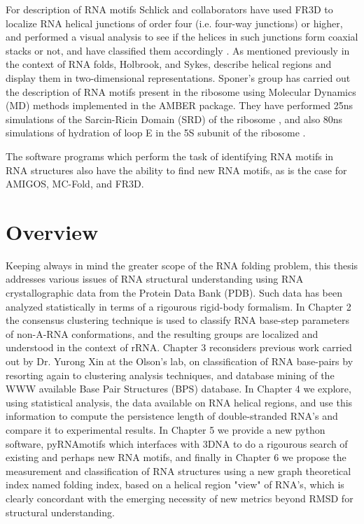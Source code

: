 For description of RNA motifs Schlick and collaborators have used FR3D
to  localize  RNA helical  junctions  of  order  four (i.e.   four-way
junctions) or  higher, and performed a  visual analysis to  see if the
helices  in  such junctions  form  coaxial  stacks  or not,  and  have
classified   them   accordingly   \cite{laing2009,  laing2009a}.    As
mentioned previously in the context of RNA folds, Holbrook, and Sykes,
describe   helical  regions  and   display  them   in  two-dimensional
representations. Sponer's group has carried out the description of RNA
motifs present  in the ribosome using Molecular  Dynamics (MD) methods
implemented  in   the  AMBER   package.   They  have   performed  25ns
simulations  of   the  Sarcin-Ricin  Domain  (SRD)   of  the  ribosome
\cite{spackova2006}, and also 80ns  simulations of hydration of loop E
in the 5S subunit of the ribosome \cite{reblova2003}.

The software programs which perform the task of identifying RNA motifs
in RNA structures also have the ability to find new RNA motifs, as is
the case for AMIGOS, MC-Fold, and FR3D.

\section{Overview}
Keeping always in  mind the greater scope of  the RNA folding problem,
this thesis  addresses various issues of  RNA structural understanding
using RNA crystallographic data from the Protein Data Bank (PDB). Such
data  has been  analyzed statistically  in terms  of a rigourous
rigid-body formalism.  In Chapter 2 the consensus clustering technique
is   used  to   classify   RNA  base-step   parameters  of   non-A-RNA
conformations, and  the resulting groups are  localized and understood
in the context  of rRNA.  Chapter 3 reconsiders  previous work carried
out by  Dr. Yurong Xin  at the Olson's  lab, on classification  of RNA
base-pairs by  resorting again to clustering  analysis techniques, and
database  mining  of the  WWW  available  Base  Pair Structures  (BPS)
database.  In  Chapter 4 we  explore, using statistical  analysis, the
data available  on RNA  helical regions, and  use this  information to
compute the persistence length of double-stranded RNA's and compare it
to  experimental  results.  In  Chapter  5 we  provide  a  new  python
software,  pyRNAmotifs which interfaces  with 3DNA  to do  a rigourous
search of existing and perhaps  new RNA motifs, and finally in Chapter
6  we propose  the measurement  and classification  of  RNA structures
using a  new graph theoretical index  named folding index,  based on a
helical region "view"  of RNA's, which is clearly  concordant with the
emerging  necessity   of  new  metrics  beyond   RMSD  for  structural
understanding.


